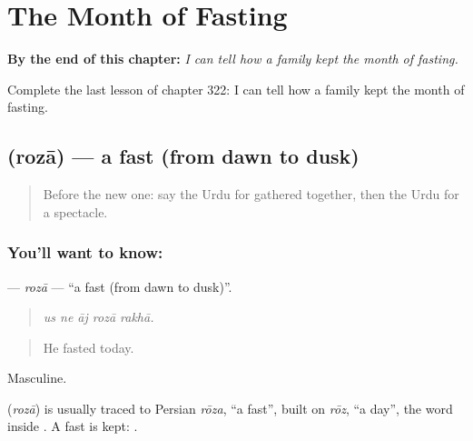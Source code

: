 
\chapter{The Month of Fasting}
\label{ch:ur-the-month-of-fasting}

\begin{chapteropening}
\textbf{By the end of this chapter:} \emph{I can tell how a family kept the month of fasting.}

Complete the last lesson of chapter 322: I can tell how a family kept the month of fasting.
\end{chapteropening}

\section[\texorpdfstring{\ur{روزہ} (rozā)}{روزہ (rozā)}]{ (rozā) — a fast (from dawn to dusk)}

\label{lesson:UR-C322-roza}



\begin{quote}
Before the new one: say the Urdu for gathered together, then the Urdu for a spectacle.
\end{quote}

\subsection*{You'll want to know: }
\textbf{} — \emph{rozā} — \textquotedblleft{}a fast (from dawn to dusk)\textquotedblright{}.

\begin{quote}
    
\end{quote}

\begin{quote}
\emph{us ne āj rozā rakhā.}
\end{quote}

\begin{quote}
He fasted today.
\end{quote}

Masculine.

\begin{cousinweb}
\textbf{} (\emph{rozā}) is usually traced to Persian \emph{rōza}, \textquotedblleft{}a fast\textquotedblright{}, built on \emph{rōz}, \textquotedblleft{}a day\textquotedblright{}, the word inside \textbf{}. A fast is kept: \textbf{ }.
\end{cousinweb}

